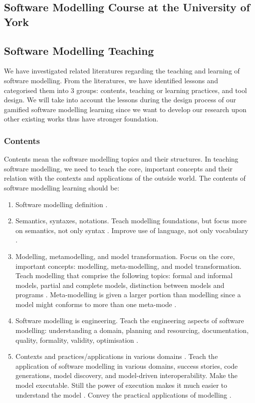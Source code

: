 \documentclass[12pt, a4paper]{report}
\begin{document}
\subsection{Software Modelling Course at the University of York}


\subsection{Software Modelling Teaching}
\label{Software Modelling Teaching}
We have investigated related literatures regarding the teaching and learning of software modelling.  From the literatures, we have identified lessons and categorised them into 3 groups: contents, teaching or learning practices, and tool design. We will take into account the lessons during the design process of our gamified software modelling learning since we want to develop our research upon other existing works thus have stronger foundation.   

\subsubsection{Contents}
Contents mean the software modelling topics and their structures. In teaching software modelling, we need to teach the core, important concepts and their relation with the contexts and applications of the outside world. The contents of software modelling learning should be:
\begin{enumerate}
\item Software modelling definition \cite{borstler2012teaching}.
\item Semantics, syntaxes, notations. Teach modelling foundations, but focus more on semantics, not only syntax \cite{borstler2012teaching}. Improve use of language, not only vocabulary \cite{bezivin2009teaching}.
\item Modelling, metamodelling, and model transformation. Focus on the core, important concepts: modelling, meta-modelling, and model transformation. Teach modelling that comprise the following topics: formal and informal models, partial and complete models, distinction between models and programs \cite{bezivin2009teaching}. Meta-modelling is given a larger portion than modelling since a model might conforms to more than one meta-mode \cite{ober2007teaching}.
\item Software modelling is engineering. Teach the engineering aspects of software modelling: understanding a domain, planning and resourcing, documentation, quality, formality, validity, optimisation \cite{paige2014bad}.
\item Contexts and practices/applications in various domains \cite{paige2014bad}. Teach the application of software modelling in various domains, success stories, code generations, model discovery, and model-driven interoperability. Make the model executable. Still the power of execution makes it much easier to understand the model \cite{bezivin2009teaching}. Convey the practical applications of modelling \cite{borstler2012teaching}.
\end{enumerate}
\end{document}
